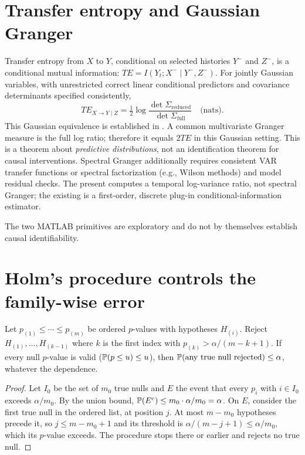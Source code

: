 \section{Transfer entropy and Gaussian Granger}
Transfer entropy from $X$ to $Y$, conditional on selected
histories $Y^-$ and $Z^-$, is a conditional mutual information:
$TE=I(Y_t;X^-\mid Y^-,Z^-)$.
For jointly Gaussian variables, with unrestricted correct
linear conditional predictors and covariance determinants
specified consistently,
\[
TE_{X\to Y\mid Z}=\tfrac12
\log\frac{\det\Sigma_{\mathrm{reduced}}}
                {\det\Sigma_{\mathrm{full}}}
\quad\text{(nats)}.
\]
This Gaussian equivalence is established in \cite{barnett2009}.
A common multivariate Granger measure is the full log ratio;
therefore it equals $2TE$ in this Gaussian setting.
This is a theorem about \emph{predictive distributions}, not an
identification theorem for causal interventions.
Spectral Granger additionally requires consistent VAR transfer
functions or spectral factorization (e.g., Wilson methods) and
model residual checks. The present
 computes a temporal
log-variance ratio, not spectral Granger; the existing
 is a first-order,
discrete plug-in conditional-information estimator.
\begin{caution}The two MATLAB primitives are exploratory and do not by themselves establish causal identifiability.\end{caution}
\section{Holm's procedure controls the family-wise error}
\begin{proposition}
Let $p_{(1)}\le\cdots\le p_{(m)}$ be ordered $p$-values with hypotheses
$H_{(i)}$. Reject $H_{(1)},\ldots,H_{(k-1)}$ where $k$ is the first index
with $p_{(k)}>\alpha/(m-k+1)$. If every null $p$-value is valid
($\mathbb{P}(p\le u)\le u$), then $\mathbb{P}(\text{any true null rejected})\le\alpha$,
whatever the dependence.
\end{proposition}
\begin{proof}
Let $I_0$ be the set of $m_0$ true nulls and $E$ the event that every
$p_i$ with $i\in I_0$ exceeds $\alpha/m_0$. By the union bound,
$\mathbb{P}(E^c)\le m_0\cdot\alpha/m_0=\alpha$. On $E$, consider the first true
null in the ordered list, at position $j$. At most $m-m_0$ hypotheses
precede it, so $j\le m-m_0+1$ and its threshold is
$\alpha/(m-j+1)\le\alpha/m_0$, which its $p$-value exceeds. The procedure
stops there or earlier and rejects no true null.
\end{proof}

